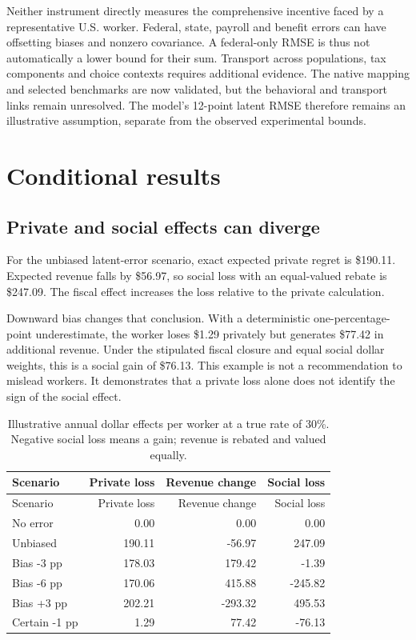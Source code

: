 \documentclass[
  11pt,
  letterpaper,
  DIV=11,
  numbers=noendperiod]{scrartcl}
\begin{document}
Neither instrument directly measures the comprehensive incentive faced
by a representative U.S. worker. Federal, state, payroll and benefit
errors can have offsetting biases and nonzero covariance. A federal-only
RMSE is thus not automatically a lower bound for their sum. Transport
across populations, tax components and choice contexts requires
additional evidence. The native mapping and selected benchmarks are now
validated, but the behavioral and transport links remain unresolved. The
model's 12-point latent RMSE therefore remains an illustrative
assumption, separate from the observed experimental bounds.

\section{Conditional results}\label{conditional-results}

\subsection{Private and social effects can
diverge}\label{private-and-social-effects-can-diverge}

For the unbiased latent-error scenario, exact expected private regret is
\$190.11. Expected revenue falls by \$56.97, so social loss with an
equal-valued rebate is \$247.09. The fiscal effect increases the loss
relative to the private calculation.

Downward bias changes that conclusion. With a deterministic
one-percentage-point underestimate, the worker loses \$1.29 privately
but generates \$77.42 in additional revenue. Under the stipulated fiscal
closure and equal social dollar weights, this is a social gain of
\$76.13. This example is not a recommendation to mislead workers. It
demonstrates that a private loss alone does not identify the sign of the
social effect.

\begin{longtable}[]{@{}lrrr@{}}
\caption{Illustrative annual dollar effects per worker at a true rate of
30\%. Negative social loss means a gain; revenue is rebated and valued
equally.}\label{tbl-scenarios}\tabularnewline
\toprule\noalign{}
Scenario & Private loss & Revenue change & Social loss \\
\midrule\noalign{}
\endfirsthead
\toprule\noalign{}
Scenario & Private loss & Revenue change & Social loss \\
\midrule\noalign{}
\endhead
\bottomrule\noalign{}
\endlastfoot
No error & 0.00 & 0.00 & 0.00 \\
Unbiased & 190.11 & -56.97 & 247.09 \\
Bias -3 pp & 178.03 & 179.42 & -1.39 \\
Bias -6 pp & 170.06 & 415.88 & -245.82 \\
Bias +3 pp & 202.21 & -293.32 & 495.53 \\
Certain -1 pp & 1.29 & 77.42 & -76.13 \\
\end{longtable}
\end{document}
